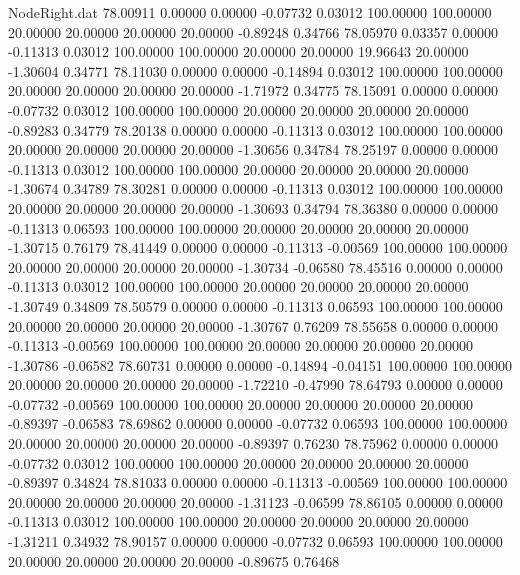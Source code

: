 \begin{filecontents}{NodeRight.dat}
  78.00911    0.00000    0.00000    -0.07732    0.03012  100.00000  100.00000   20.00000   20.00000   20.00000   20.00000   -0.89248    0.34766
  78.05970    0.03357    0.00000    -0.11313    0.03012  100.00000  100.00000   20.00000   20.00000   19.96643   20.00000   -1.30604    0.34771
  78.11030    0.00000    0.00000    -0.14894    0.03012  100.00000  100.00000   20.00000   20.00000   20.00000   20.00000   -1.71972    0.34775
  78.15091    0.00000    0.00000    -0.07732    0.03012  100.00000  100.00000   20.00000   20.00000   20.00000   20.00000   -0.89283    0.34779
  78.20138    0.00000    0.00000    -0.11313    0.03012  100.00000  100.00000   20.00000   20.00000   20.00000   20.00000   -1.30656    0.34784
  78.25197    0.00000    0.00000    -0.11313    0.03012  100.00000  100.00000   20.00000   20.00000   20.00000   20.00000   -1.30674    0.34789
  78.30281    0.00000    0.00000    -0.11313    0.03012  100.00000  100.00000   20.00000   20.00000   20.00000   20.00000   -1.30693    0.34794
  78.36380    0.00000    0.00000    -0.11313    0.06593  100.00000  100.00000   20.00000   20.00000   20.00000   20.00000   -1.30715    0.76179
  78.41449    0.00000    0.00000    -0.11313   -0.00569  100.00000  100.00000   20.00000   20.00000   20.00000   20.00000   -1.30734   -0.06580
  78.45516    0.00000    0.00000    -0.11313    0.03012  100.00000  100.00000   20.00000   20.00000   20.00000   20.00000   -1.30749    0.34809
  78.50579    0.00000    0.00000    -0.11313    0.06593  100.00000  100.00000   20.00000   20.00000   20.00000   20.00000   -1.30767    0.76209
  78.55658    0.00000    0.00000    -0.11313   -0.00569  100.00000  100.00000   20.00000   20.00000   20.00000   20.00000   -1.30786   -0.06582
  78.60731    0.00000    0.00000    -0.14894   -0.04151  100.00000  100.00000   20.00000   20.00000   20.00000   20.00000   -1.72210   -0.47990
  78.64793    0.00000    0.00000    -0.07732   -0.00569  100.00000  100.00000   20.00000   20.00000   20.00000   20.00000   -0.89397   -0.06583
  78.69862    0.00000    0.00000    -0.07732    0.06593  100.00000  100.00000   20.00000   20.00000   20.00000   20.00000   -0.89397    0.76230
  78.75962    0.00000    0.00000    -0.07732    0.03012  100.00000  100.00000   20.00000   20.00000   20.00000   20.00000   -0.89397    0.34824
  78.81033    0.00000    0.00000    -0.11313   -0.00569  100.00000  100.00000   20.00000   20.00000   20.00000   20.00000   -1.31123   -0.06599
  78.86105    0.00000    0.00000    -0.11313    0.03012  100.00000  100.00000   20.00000   20.00000   20.00000   20.00000   -1.31211    0.34932
  78.90157    0.00000    0.00000    -0.07732    0.06593  100.00000  100.00000   20.00000   20.00000   20.00000   20.00000   -0.89675    0.76468

\end{filecontents}
